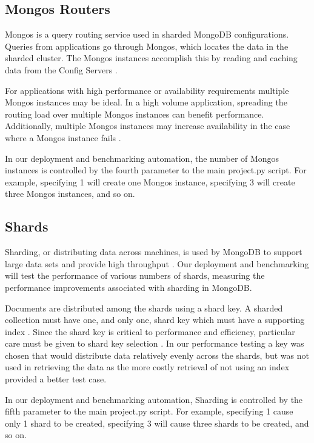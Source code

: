 \documentclass[9pt,twocolumn,twoside]{../../styles/osajnl}
\begin{document}
\subsection{Mongos Routers}

Mongos is a query routing service used in sharded MongoDB
configurations. Queries from applications go through Mongos, which
locates the data in the sharded cluster. The Mongos instances
accomplish this by reading and caching data from the Config Servers
\cite{www-mongoMongos}.

For applications with high performance or availability requirements
multiple Mongos instances may be ideal. In a high volume application,
spreading the routing load over multiple Mongos instances can benefit
performance. Additionally, multiple Mongos instances may increase
availability in the case where a Mongos instance fails
\cite{www-mongoConfig}.

In our deployment and benchmarking automation, the number of Mongos
instances is controlled by the fourth parameter to the main project.py
script. For example, specifying 1 will create one Mongos instance,
specifying 3 will create three Mongos instances, and so on.


\subsection{Shards}

Sharding, or distributing data across machines, is used by MongoDB to
support large data sets and provide high throughput
\cite{www-sharding}. Our deployment and benchmarking will test the
performance of various numbers of shards, measuring the performance
improvements associated with sharding in MongoDB.

Documents are distributed among the shards using a shard key. A
sharded collection must have one, and only one, shard key which must
have a supporting index \cite{www-sharding}. Since the shard key is
critical to performance and efficiency, particular care must be given
to shard key selection \cite{www-shardkey}. In our performance testing
a key was chosen that would distribute data relatively evenly across
the shards, but was not used in retrieving the data as the more costly
retrieval of not using an index provided a better test case.


In our deployment and benchmarking automation, Sharding is controlled
by the fifth parameter to the main project.py script. For example,
specifying 1 cause only 1 shard to be created, specifying 3 will cause
three shards to be created, and so on.
\end{document}
